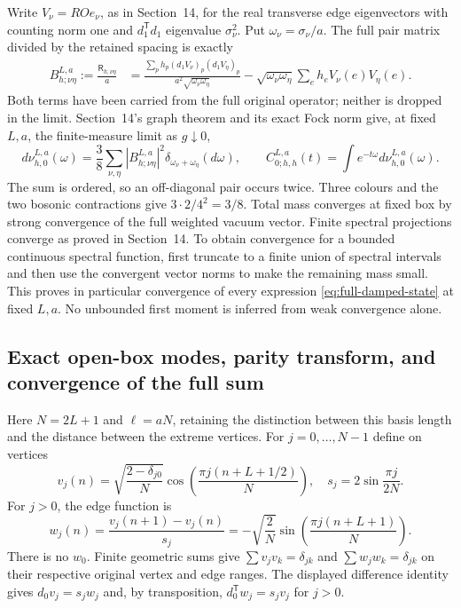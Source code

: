 Write $V_\nu=RO e_\nu$, as in Section~14, for the real transverse
edge eigenvectors with counting norm one and $d_1^{\mathsf T}d_1$
eigenvalue $\sigma_\nu^2$. Put $\omega_\nu=\sigma_\nu/a$. The full pair
matrix divided by the retained spacing is exactly
\begin{align}
 B_{h;\nu\eta}^{L,a}:=\frac{\mathsf R_{h;\nu\eta}}{a}
 &= \frac{\sum_p h_p(d_1V_\nu)_p(d_1V_\eta)_p}
                  {a^2\sqrt{\omega_\nu\omega_\eta}}
       -\sqrt{\omega_\nu\omega_\eta}\sum_e h_e V_\nu(e)V_\eta(e).
 \label{eq:full-pair-native}
\end{align}
Both terms have been carried from the full original operator; neither
is dropped in the limit. Section~14's graph theorem and its exact Fock
norm give, at fixed $L,a$, the finite-measure limit as $g\downarrow0$,
\begin{equation}\label{eq:full-finite-measure}
 d\nu_{h,0}^{L,a}(\omega)
 =\frac38\sum_{\nu,\eta}|B_{h;\nu\eta}^{L,a}|^2
                 \delta_{\omega_\nu+\omega_\eta}(d\omega),
 \qquad C_{0;h,h}^{L,a}(t)=\int e^{-t\omega}d\nu_{h,0}^{L,a}(\omega).
\end{equation}
The sum is ordered, so an off-diagonal pair occurs twice. Three colours
and the two bosonic contractions give $3\cdot2/4^2=3/8$.
Total mass converges at fixed box by strong convergence of the full
weighted vacuum vector. Finite spectral projections converge as proved
in Section~14. To obtain convergence for a bounded continuous spectral
function, first truncate to a finite union of spectral intervals and
then use the convergent vector norms to make the remaining mass small.
This proves in particular convergence of every expression
\eqref{eq:full-damped-state} at fixed $L,a$. No unbounded first moment is
inferred from weak convergence alone.

\subsection{Exact open-box modes, parity transform, and convergence of the full sum}

Here $N=2L+1$ and $\ell=aN$, retaining the distinction between this
basis length and the distance between the extreme vertices. For
$j=0,\ldots,N-1$ define on vertices
\[
 v_j(n)=\sqrt{\frac{2-\delta_{j0}}N}
       \cos\!\left(\frac{\pi j(n+L+1/2)}N\right),
 \quad s_j=2\sin\frac{\pi j}{2N}.
\]
For $j>0$, the edge function is
\[
 w_j(n)=\frac{v_j(n+1)-v_j(n)}{s_j}
       =-\sqrt{\frac2N}\sin\!\left(\frac{\pi j(n+L+1)}N\right).
\]
There is no $w_0$. Finite geometric sums give
$\sum v_jv_k=\delta_{jk}$ and $\sum w_jw_k=\delta_{jk}$ on their
respective original vertex and edge ranges. The displayed difference
identity gives $d_0v_j=s_jw_j$ and, by transposition,
$d_0^{\mathsf T}w_j=s_jv_j$ for $j>0$.

